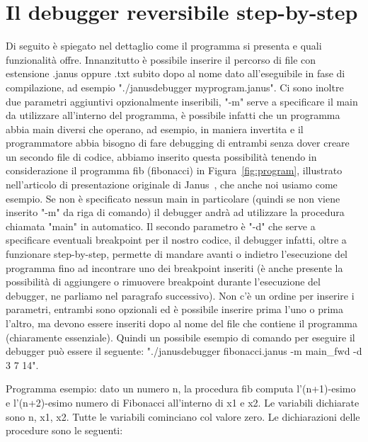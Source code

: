 \documentclass{article}
\theoremstyle{plain}
\theoremstyle{definition}
\theoremstyle{plain}
\begin{document}
\section{Il debugger reversibile step-by-step}
Di seguito è spiegato nel dettaglio come il programma si presenta e quali funzionalità offre. Innanzitutto è possibile inserire il percorso di file con estensione .janus oppure .txt subito dopo al nome dato all'eseguibile in fase di compilazione, ad esempio "./janusdebugger myprogram.janus". Ci sono inoltre due parametri aggiuntivi opzionalmente inseribili, "-m" serve a specificare il main da utilizzare all'interno del programma, è possibile infatti che un programma abbia main diversi che operano, ad esempio, in maniera invertita e il programmatore abbia bisogno di fare debugging di entrambi senza dover creare un secondo file di codice, abbiamo inserito questa possibilità tenendo in considerazione il programma fib (fibonacci) in Figura~\ref{fig:program}, illustrato nell'articolo di presentazione originale di Janus~\cite{JanusSem}, che anche noi usiamo come esempio. Se non è specificato nessun main in particolare (quindi se non viene inserito "-m" da riga di comando) il debugger andrà ad utilizzare la procedura chiamata "main" in automatico. Il secondo parametro è "-d" che serve a specificare eventuali breakpoint per il nostro codice, il debugger infatti, oltre a funzionare step-by-step, permette di mandare avanti o indietro l'esecuzione del programma fino ad incontrare uno dei breakpoint inseriti (è anche presente la possibilità di aggiungere o rimuovere breakpoint durante l'esecuzione del debugger, ne parliamo nel paragrafo successivo). Non c'è un ordine per inserire i parametri, entrambi sono opzionali ed è possibile inserire prima l'uno o prima l'altro, ma devono essere inseriti dopo al nome del file che contiene il programma (chiaramente essenziale). Quindi un possibile esempio di comando per eseguire il debugger può essere il seguente: "./janusdebugger fibonacci.janus -m main\_fwd -d 3 7 14".
\bigskip

Programma esempio: dato un numero n, la procedura fib computa l'(n+1)-esimo e l'(n+2)-esimo numero di Fibonacci all'interno di x1 e x2. Le variabili dichiarate sono n, x1, x2. Tutte le variabili cominciano col valore zero. Le dichiarazioni delle procedure sono le seguenti:
\end{document}
